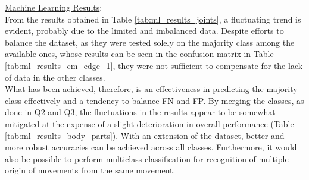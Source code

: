 \underline{Machine Learning Results}:\\
From the results obtained in Table \ref{tab:ml_results_joints}, a fluctuating trend is evident, probably due to the limited and imbalanced data. 
Despite efforts to balance the dataset, as they were tested solely on the majority class among the available ones, whose results can be seen in the confusion matrix in Table \ref{tab:ml_results_cm_edge_1}, 
they were not sufficient to compensate for the lack of data in the other classes. \\
What has been achieved, therefore, is an effectiveness in predicting the majority class effectively and a tendency to balance FN and FP. 
By merging the classes, as done in Q2 and Q3, the fluctuations in the results appear to be somewhat mitigated at the expense of a slight deterioration in overall performance (Table \ref{tab:ml_results_body_parts}).
With an extension of the dataset, better and more robust accuracies can be achieved across all classes.
Furthermore, it would also be possible to perform multiclass classification for recognition of multiple origin of movements from the same movement.\\

